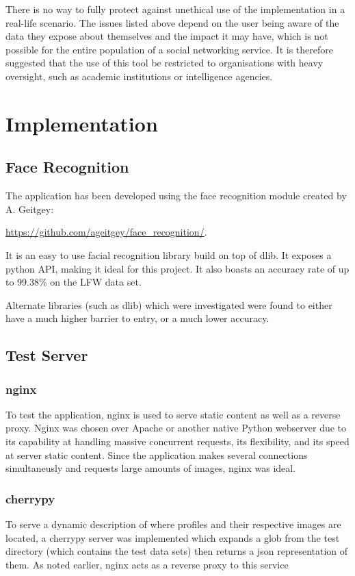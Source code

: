 \documentclass[12pt]{article}
\begin{document}
There is no way to fully protect against unethical use of the implementation in a real-life scenario. The issues listed above depend on the user being aware of the data they expose about themselves and the impact it may have, which is not possible for the entire population of a social networking service. It is therefore suggested that the use of this tool be restricted to organisations with heavy oversight, such as academic institutions or intelligence agencies.

\newpage
\section{Implementation}
\subsection{Face Recognition}
The application has been developed using the face recognition module created by A. Geitgey:

\url{https://github.com/ageitgey/face\_recognition/}.

It is an easy to use facial recognition library build on top of dlib. It exposes a python API, making it ideal for this project. It also boasts an accuracy rate of up to 99.38\% on the LFW data set.

Alternate libraries (such as dlib) which were investigated were found to either have a much higher barrier to entry, or a much lower accuracy.

\subsection{Test Server}
\subsubsection{nginx}
To test the application, nginx is used to serve static content as well as a reverse proxy. Nginx was chosen over Apache or another native Python webserver due to its capability at handling massive concurrent requests, its flexibility, and its speed at server static content. Since the application makes several connections simultaneusly and requests large amounts of images, nginx was ideal.

\subsubsection{cherrypy}
To serve a dynamic description of where profiles and their respective images are located, a cherrypy server was implemented which expands a glob from the test directory (which contains the test data sets) then returns a json representation of them. As noted earlier, nginx acts as a reverse proxy to this service
\end{document}
